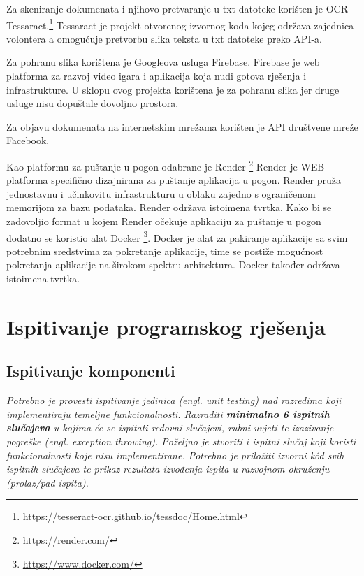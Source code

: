 			Za skeniranje dokumenata i njihovo pretvaranje u txt datoteke korišten je OCR Tessaract.\footnote{\url{https://tesseract-ocr.github.io/tessdoc/Home.html}} Tessaract je projekt otvorenog izvornog koda kojeg održava zajednica volontera a omogućuje pretvorbu slika teksta u txt datoteke preko API-a.
			
			Za pohranu slika korištena je Googleova usluga Firebase. Firebase je web platforma za razvoj video igara i aplikacija koja nudi gotova rješenja i infrastrukture. U sklopu ovog projekta korištena je za pohranu slika jer druge usluge nisu dopuštale dovoljno prostora.
			
			Za objavu dokumenata na internetskim mrežama korišten je API društvene mreže Facebook.
			
			Kao platformu za puštanje u pogon odabrane je Render \footnote{\url{https://render.com/}} Render je WEB platforma specifično dizajnirana za puštanje aplikacija u pogon. Render pruža jednostavnu i učinkovitu infrastrukturu u oblaku zajedno s ograničenom memorijom za bazu podataka. Render održava istoimena tvrtka. Kako bi se zadovoljio format u kojem Render očekuje aplikaciju za puštanje u pogon dodatno se koristio alat Docker \footnote{\url{https://www.docker.com/}}. Docker je alat za pakiranje aplikacije sa svim potrebnim sredstvima za pokretanje aplikacije, time se postiže mogućnost pokretanja aplikacije na širokom spektru arhitektura. Docker također održava istoimena tvrtka.
			
		
	
		\section{Ispitivanje programskog rješenja}
			
			\subsection{Ispitivanje komponenti}
			\textit{Potrebno je provesti ispitivanje jedinica (engl. unit testing) nad razredima koji implementiraju temeljne funkcionalnosti. Razraditi \textbf{minimalno 6 ispitnih slučajeva} u kojima će se ispitati redovni slučajevi, rubni uvjeti te izazivanje pogreške (engl. exception throwing). Poželjno je stvoriti i ispitni slučaj koji koristi funkcionalnosti koje nisu implementirane. Potrebno je priložiti izvorni kôd svih ispitnih slučajeva te prikaz rezultata izvođenja ispita u razvojnom okruženju (prolaz/pad ispita). }
			
			
			
